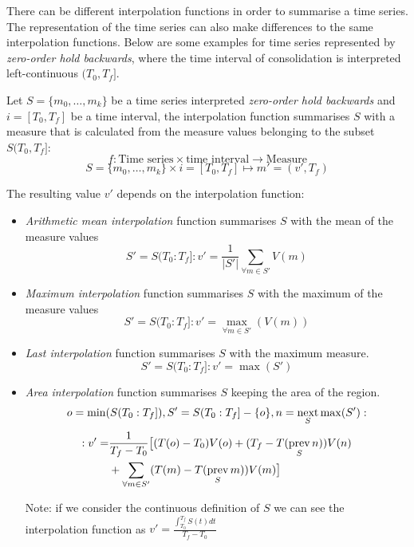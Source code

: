 There can be different interpolation functions in order to summarise a
time series. The representation of the time series can also make
differences to the same interpolation functions. Below are some
examples for time series represented by \emph{zero-order hold
  backwards}, where the time interval of consolidation is interpreted
left-continuous $(T_0,T_f]$.



\begin{definition}
  Let $S=\{m_0,\ldots,m_k\}$ be a time series interpreted
  \emph{zero-order hold backwards} and $i=[T_0,T_f]$ be a time
  interval, the interpolation function summarises $S$ with a measure
  that is calculated from the measure values belonging to the subset
  $S(T_0,T_f]$:
  \[
  f: \text{Time series} \times \text{time interval}
  \longrightarrow \text{Measure}
  \]
  \[
  S=\{m_0,\ldots,m_k\} \times i=[T_0,T_f] \mapsto m'=(v',T_f)
  \]

  The resulting value $v'$ depends on the interpolation function:

\begin{itemize}

\item \emph{Arithmetic mean interpolation} function summarises $S$
  with the mean of the measure values
  \[
  S'=S(T_0:T_f]:
  v' = \frac{1}{|S'|} \sum\limits_{\forall m\in S'} V(m)
  \]

\item \emph{Maximum interpolation} function summarises $S$ with the
  maximum of the measure values
  \[
  S'=S(T_0:T_f]:
  v' = \max_{\forall m \in S'}(V(m))
  \]

\item \emph{Last interpolation} function summarises $S$ with the
  maximum measure.
  \[
  S'=S(T_0:T_f]:
  v' = \max(S')
  \]

\item \emph{Area interpolation} function summarises $S$ keeping the
  area of the region.
  \[
  o=\min(S(T_0:T_f]),
  S'= S(T_0:T_f] - \{o\},
  n=\operatorname*{next}\limits_S \max(S'): 
  \]
  \[
  \begin{split}
  :v'  = & \frac{1}{T_f-T_0} 
  \big[ (T(o)-T_0)V(o) +( T_f- T(\operatorname*{prev}\limits_S n) )V(n) \\
    & {}+\sum\limits_{\forall m \in S'}( T(m)- T(\operatorname*{prev}\limits_S m) )V(m) \big]   
   \end{split}
  \]
  
  Note: if we consider the continuous definition of $S$ we can see the
  interpolation function as $v' = \frac{\int_{T_0}^{T_f} S(t) dt}{T_f
    - T_0}$

\end{itemize}

\end{definition}


